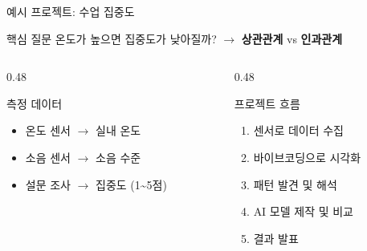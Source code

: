 \documentclass[aspectratio=169, 11pt]{beamer}
\begin{document}
\begin{frame}{예시 프로젝트: 수업 집중도}
\begin{alertblock}{핵심 질문}
온도가 높으면 집중도가 낮아질까? $\rightarrow$ \textbf{상관관계} vs \textbf{인과관계}
\end{alertblock}

\vspace{0.3em}

\begin{columns}[T, totalwidth=\textwidth]
\begin{column}{0.48\textwidth}
\begin{block}{측정 데이터}
\begin{itemize}
    \item 온도 센서 $\rightarrow$ 실내 온도
    \item 소음 센서 $\rightarrow$ 소음 수준
    \item 설문 조사 $\rightarrow$ 집중도 (1\textasciitilde5점)
\end{itemize}
\end{block}
\end{column}
\hfill
\begin{column}{0.48\textwidth}
\begin{exampleblock}{프로젝트 흐름}
\begin{enumerate}
    \item 센서로 데이터 수집
    \item 바이브코딩으로 시각화
    \item 패턴 발견 및 해석
    \item AI 모델 제작 및 비교
    \item 결과 발표
\end{enumerate}
\end{exampleblock}
\end{column}
\end{columns}
\end{frame}
\end{document}
